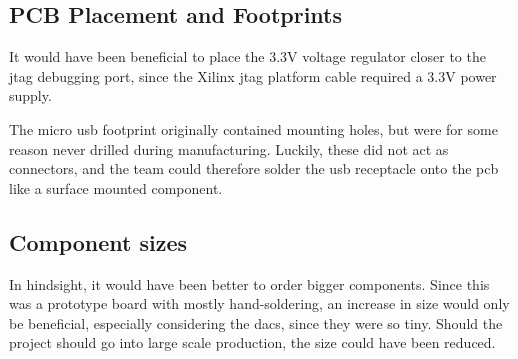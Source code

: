 \subsection{PCB Placement and Footprints}
It would have been beneficial to place the 3.3V voltage regulator closer to the \gls{jtag} debugging port, since the Xilinx \gls{jtag} platform cable required a 3.3V power supply.

The micro \gls{usb} footprint originally contained mounting holes, but were for some reason never drilled during manufacturing. 
Luckily, these did not act as connectors, and the team could therefore solder the \gls{usb} receptacle onto the \gls{pcb} like a surface mounted component.

\subsection{Component sizes}
In hindsight, it would have been better to order bigger components. 
Since this was a prototype board with mostly hand-soldering, an increase in size would only be beneficial, especially considering the \gls{dac}s, since they were so tiny. 
Should the project should go into large scale production, the size could have been reduced.